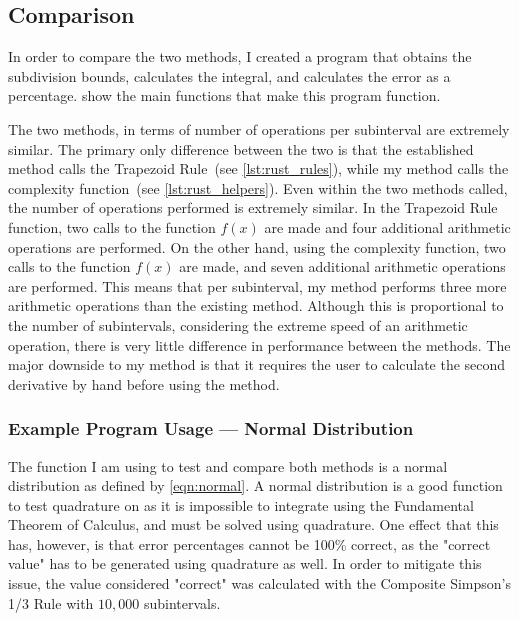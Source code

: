 \documentclass{paper}
\begin{document}




\subsection{Comparison}
\label{sec:comparison}
In order to compare the two methods, I created a program that obtains the subdivision bounds, calculates the integral, and calculates the error as a percentage.
 show the main functions that make this program function.









The two methods, in terms of number of operations per subinterval are extremely similar.
The primary only difference between the two is that the established method calls the Trapezoid Rule~(see \cref{lst:rust_rules}), while my method calls the complexity function~(see \cref{lst:rust_helpers}).
Even within the two methods called, the number of operations performed is extremely similar.
In the Trapezoid Rule function, two calls to the function \(f(x)\) are made and four additional arithmetic operations are performed.
On the other hand, using the complexity function, two calls to the function \(f(x)\) are made, and seven additional arithmetic operations are performed.
This means that per subinterval, my method performs three more arithmetic operations than the existing method.
Although this is proportional to the number of subintervals, considering the extreme speed of an arithmetic operation, there is very little difference in performance between the methods.
The major downside to my method is that it requires the user to calculate the second derivative by hand before using the method.

\subsubsection{Example Program Usage --- Normal Distribution}
\label{sec:normal}
The function I am using to test and compare both methods is a normal distribution as defined by \cref{eqn:normal}.
A normal distribution is a good function to test quadrature on as it is impossible to integrate using the Fundamental Theorem of Calculus, and must be solved using quadrature.
One effect that this has, however, is that error percentages cannot be 100\% correct, as the "correct value" has to be generated using quadrature as well.
In order to mitigate this issue, the value considered "correct" was calculated with the Composite Simpson's 1/3 Rule with \(10,000\) subintervals.
\end{document}
